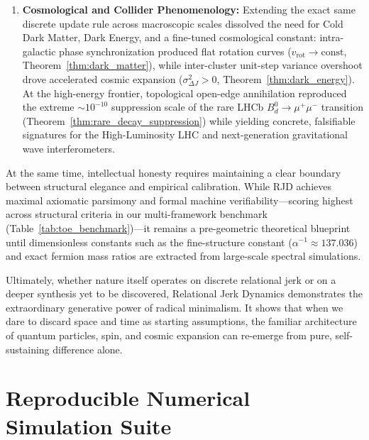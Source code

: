 \documentclass[11pt,a4paper]{article}
\theoremstyle{plain}
\theoremstyle{definition}
\theoremstyle{remark}
\begin{document}
\begin{enumerate}
    \item \textbf{Cosmological and Collider Phenomenology:} Extending the exact same discrete update rule across macroscopic scales dissolved the need for Cold Dark Matter, Dark Energy, and a fine-tuned cosmological constant: intra-galactic phase synchronization produced flat rotation curves ($v_{\mathrm{rot}} \to \text{const}$, Theorem~\ref{thm:dark_matter}), while inter-cluster unit-step variance overshoot drove accelerated cosmic expansion ($\sigma_{\Delta J}^2 > 0$, Theorem~\ref{thm:dark_energy}). At the high-energy frontier, topological open-edge annihilation reproduced the extreme $\sim 10^{-10}$ suppression scale of the rare LHCb $B_d^0 \to \mu^+ \mu^-$ transition (Theorem~\ref{thm:rare_decay_suppression}) while yielding concrete, falsifiable signatures for the High-Luminosity LHC and next-generation gravitational wave interferometers.
\end{enumerate}

At the same time, intellectual honesty requires maintaining a clear boundary between structural elegance and empirical calibration. While RJD achieves maximal axiomatic parsimony and formal machine verifiability—scoring highest across structural criteria in our multi-framework benchmark (Table~\ref{tab:toe_benchmark})—it remains a pre-geometric theoretical blueprint until dimensionless constants such as the fine-structure constant ($\alpha^{-1} \approx 137.036$) and exact fermion mass ratios are extracted from large-scale spectral simulations.

Ultimately, whether nature itself operates on discrete relational jerk or on a deeper synthesis yet to be discovered, Relational Jerk Dynamics demonstrates the extraordinary generative power of radical minimalism. It shows that when we dare to discard space and time as starting assumptions, the familiar architecture of quantum particles, spin, and cosmic expansion can re-emerge from pure, self-sustaining difference alone.

\newpage
\appendix

\section{Reproducible Numerical Simulation Suite}
\label{app:python_suite}
\end{document}
